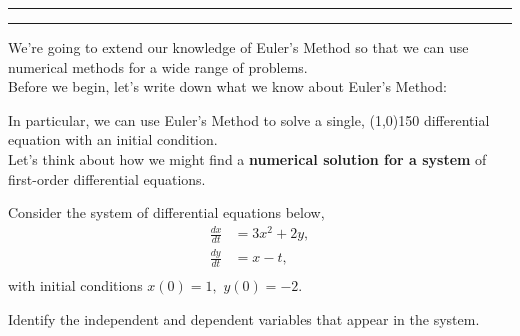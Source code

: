 \pagestyle{empty}
\noindent\rule{7in}{0.4pt}
\begin{center}  
\end{center}
\noindent\rule{7in}{0.4pt} \vspace{0.25cm}

%

\noindent  We're going to extend our knowledge of Euler's Method so that we can use numerical
methods for a wide range of problems.\\

\noindent Before we begin, let's write down what we know about Euler's Method:\\ \vspace{1.5in}

\noindent  In particular, we can use Euler's Method to solve a single, \line(1,0){150} differential
 equation with an initial condition.\\

\noindent  Let's think about how we might find a {\bf numerical solution for a system} of first-order
differential equations.

\ben
\item  Consider the system of differential equations below,
 \begin{align*}
 \frac{dx}{dt} &= 3x^2 + 2y,\\
 \frac{dy}{dt} &= x-t,\\
 \end{align*}
 with initial conditions $x(0) = 1,$ \hspace{0.25cm} $y(0) = -2.$

 \ben
 \item  Identify the independent and dependent variables that appear in the system.\\ \vspace{0.5in}

